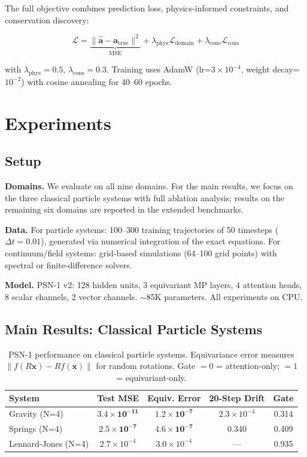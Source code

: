\documentclass[11pt,a4paper]{article}
\begin{document}
The full objective combines prediction loss, physics-informed constraints, and conservation discovery:

\begin{equation}
    \mathcal{L} = \underbrace{\|\hat{\mathbf{a}} - \mathbf{a}_{\text{true}}\|^2}_{\text{MSE}} + \lambda_{\text{phys}} \mathcal{L}_{\text{domain}} + \lambda_{\text{cons}} \mathcal{L}_{\text{cons}}
\end{equation}

with $\lambda_{\text{phys}} = 0.5$, $\lambda_{\text{cons}} = 0.3$. Training uses AdamW (lr=$3\times 10^{-4}$, weight decay=$10^{-2}$) with cosine annealing for 40--60 epochs.

\section{Experiments}

\subsection{Setup}

\textbf{Domains.} We evaluate on all nine domains. For the main results, we focus on the three classical particle systems with full ablation analysis; results on the remaining six domains are reported in the extended benchmarks.

\textbf{Data.} For particle systems: 100--300 training trajectories of 50 timesteps ($\Delta t = 0.01$), generated via numerical integration of the exact equations. For continuum/field systems: grid-based simulations (64--100 grid points) with spectral or finite-difference solvers.

\textbf{Model.} PSN-1 v2: 128 hidden units, 3 equivariant MP layers, 4 attention heads, 8 scalar channels, 2 vector channels. $\sim$85K parameters. All experiments on CPU.

\subsection{Main Results: Classical Particle Systems}

\begin{table}[H]
\centering
\caption{PSN-1 performance on classical particle systems. Equivariance error measures $\|f(R\mathbf{x}) - Rf(\mathbf{x})\|$ for random rotations. Gate $=0$ = attention-only; $=1$ = equivariant-only.}
\label{tab:main}
\begin{tabular}{lcccc}
\toprule
System & Test MSE & Equiv. Error & 20-Step Drift & Gate \\
\midrule
Gravity (N=4) & $\mathbf{3.4 \times 10^{-11}}$ & $\mathbf{1.2 \times 10^{-7}}$ & $2.3 \times 10^{-4}$ & 0.314 \\
Springs (N=4) & $\mathbf{2.5 \times 10^{-7}}$ & $\mathbf{4.6 \times 10^{-7}}$ & 0.340 & 0.409 \\
Lennard-Jones (N=4) & $2.7 \times 10^{-4}$ & $3.0 \times 10^{-4}$ & --- & 0.935 \\
\bottomrule
\end{tabular}
\end{table}
\end{document}
